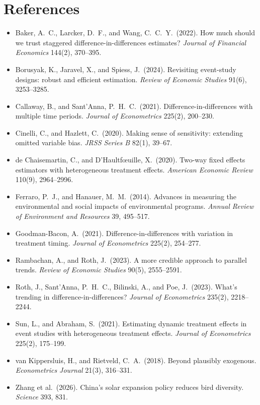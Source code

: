 \documentclass[11pt]{article}
\begin{document}
\section*{References}
\small
\begin{itemize}[leftmargin=12pt]
\item Baker, A.\ C., Larcker, D.\ F., and Wang, C.\ C.\ Y.\ (2022). How much should we trust staggered difference-in-differences estimates? \textit{Journal of Financial Economics} 144(2), 370--395.
\item Borusyak, K., Jaravel, X., and Spiess, J.\ (2024). Revisiting event-study designs: robust and efficient estimation. \textit{Review of Economic Studies} 91(6), 3253--3285.
\item Callaway, B., and Sant'Anna, P.\ H.\ C.\ (2021). Difference-in-differences with multiple time periods. \textit{Journal of Econometrics} 225(2), 200--230.
\item Cinelli, C., and Hazlett, C.\ (2020). Making sense of sensitivity: extending omitted variable bias. \textit{JRSS Series B} 82(1), 39--67.
\item de Chaisemartin, C., and D'Haultf\oe uille, X.\ (2020). Two-way fixed effects estimators with heterogeneous treatment effects. \textit{American Economic Review} 110(9), 2964--2996.
\item Ferraro, P.\ J., and Hanauer, M.\ M.\ (2014). Advances in measuring the environmental and social impacts of environmental programs. \textit{Annual Review of Environment and Resources} 39, 495--517.
\item Goodman-Bacon, A.\ (2021). Difference-in-differences with variation in treatment timing. \textit{Journal of Econometrics} 225(2), 254--277.
\item Rambachan, A., and Roth, J.\ (2023). A more credible approach to parallel trends. \textit{Review of Economic Studies} 90(5), 2555--2591.
\item Roth, J., Sant'Anna, P.\ H.\ C., Bilinski, A., and Poe, J.\ (2023). What's trending in difference-in-differences? \textit{Journal of Econometrics} 235(2), 2218--2244.
\item Sun, L., and Abraham, S.\ (2021). Estimating dynamic treatment effects in event studies with heterogeneous treatment effects. \textit{Journal of Econometrics} 225(2), 175--199.
\item van Kippersluis, H., and Rietveld, C.\ A.\ (2018). Beyond plausibly exogenous. \textit{Econometrics Journal} 21(3), 316--331.
\item Zhang et al.\ (2026). China's solar expansion policy reduces bird diversity. \textit{Science} 393, 831.
\end{itemize}
\end{document}
